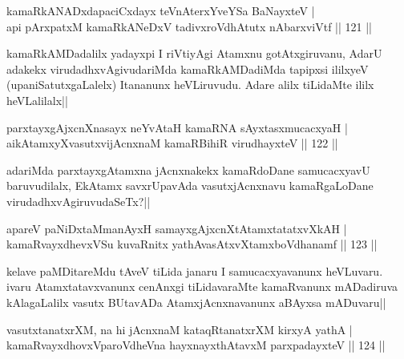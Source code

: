 
\begin{shl}
kamaRkANADxdapaciCxdayx teVnAterxYveYSa BaNayxteV |\\
api pArxpatxM kamaRkANeDxV tadivxroVdhAtutx nAbarxviVtf \hfill || 121 ||
\end{shl}

\begin{artha}
kamaRkAMDadalilx yadayxpi I riVtiyAgi Atamxnu gotAtxgiruvanu, AdarU adakekx virudadhxvAgivudariMda kamaRkAMDadiMda tapipxsi ililxyeV (upaniSatutxgaLalelx) Itananunx heVLiruvudu. Adare alilx tiLidaMte ililx heVLalilalx||
\end{artha}


\begin{shl}
parxtayxgAjxcnXnasayx neYvAtaH kamaRNA sAyxtasxmucacxyaH |\\
aikAtamxyXvasutxvijAcnxnaM kamaRBihiR virudhayxteV \hfill || 122 ||
\end{shl}

\begin{artha}
adariMda parxtayxgAtamxna jAcnxnakekx kamaRdoDane samucacxyavU baruvudilalx, EkAtamx savxrUpavAda vasutxjAcnxnavu kamaRgaLoDane virudadhxvAgiruvudaSeTx?||
\end{artha}


\begin{shl}
apareV paNiDxtaMmanAyxH samayxgAjxcnXtAtamxtatatxvXkAH |\\
kamaRvayxdhevxVSu kuvaRnitx yathAvasAtxvXtamxboVdhanamf \hfill || 123 ||
\end{shl}

\begin{artha}
kelave paMDitareMdu tAveV tiLida janaru I samucacxyavanunx heVLuvaru. ivaru Atamxtatavxvanunx cenAnxgi tiLidavaraMte kamaRvanunx mADadiruva kAlagaLalilx vasutx BUtavADa AtamxjAcnxnavanunx aBAyxsa mADuvaru||
\end{artha}


\begin{shl}
vasutxtanatxrXM, na hi jAcnxnaM kataqRtanatxrXM kirxyA yathA |\\
kamaRvayxdhovxVparoVdheVna hayxnayxthAtavxM parxpadayxteV \hfill || 124 ||
\end{shl}

